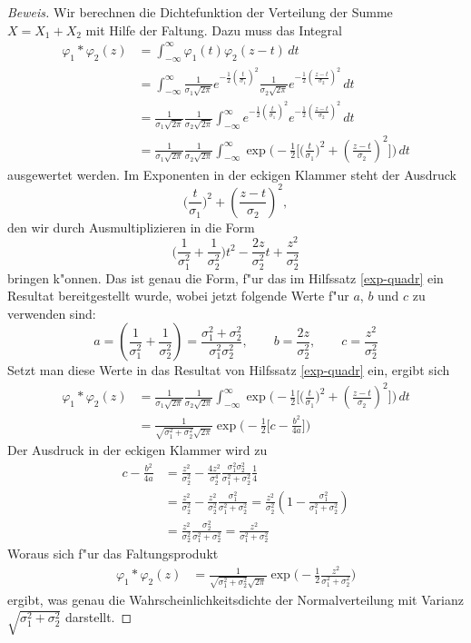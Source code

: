 \begin{proof}[Beweis]
Wir berechnen die Dichtefunktion der Verteilung der Summe $X=X_1+X_2$
mit Hilfe der Faltung. 
Dazu muss das Integral 
\begin{align*}
\varphi_1*\varphi_2(z)
&=
\int_{-\infty}^{\infty}\varphi_1(t)\varphi_2(z-t)\,dt\\
&=
\int_{-\infty}^{\infty}
\frac1{\sigma_1\sqrt{2\pi}}e^{-\frac12\left(\frac{t}{\sigma_1}\right)^2}
\frac1{\sigma_2\sqrt{2\pi}}e^{-\frac12\left(\frac{z-t}{\sigma_2}\right)^2}
\,dt\\
&=
\frac1{\sigma_1\sqrt{2\pi}}
\frac1{\sigma_2\sqrt{2\pi}}
\int_{-\infty}^{\infty}
e^{-\frac12\left(\frac{t}{\sigma_1}\right)^2}
e^{-\frac12\left(\frac{z-t}{\sigma_2}\right)^2}
\,dt\\
&=
\frac1{\sigma_1\sqrt{2\pi}}
\frac1{\sigma_2\sqrt{2\pi}}
\int_{-\infty}^{\infty}
\exp\biggl(-\frac12\biggl[\biggl(\frac{t}{\sigma_1}\biggr)^2
+\left(\frac{z-t}{\sigma_2}\right)^2\biggr]\biggr)
\,dt
\end{align*}
ausgewertet werden.
Im Exponenten in der eckigen Klammer steht der Ausdruck
\[
\biggl(\frac{t}{\sigma_1}\biggr)^2 +\left(\frac{z-t}{\sigma_2}\right)^2,
\]
den wir durch Ausmultiplizieren in die Form
\[
\biggl(\frac1{\sigma_1^2}+\frac1{\sigma_2^2}\biggr)t^2
-\frac{2z}{\sigma_2^2}t+\frac{z^2}{\sigma_2^2}
\]
bringen k"onnen.
Das ist genau die Form, f"ur das im Hilfssatz \ref{exp-quadr}
ein Resultat bereitgestellt wurde, wobei jetzt folgende Werte f"ur $a$, $b$ und $c$
zu verwenden sind:
\[
a=\left(\frac1{\sigma_1^2}+\frac1{\sigma_2^2}\right)
=\frac{\sigma_1^2+\sigma_2^2}{\sigma_1^2\sigma_2^2},\qquad
b=\frac{2z}{\sigma_2^2},\qquad
c=\frac{z^2}{\sigma_2^2}
\]
Setzt man diese Werte in das Resultat von Hilfssatz \ref{exp-quadr} ein,
ergibt sich
\begin{align*}
\varphi_1*\varphi_2(z)
&=
\frac1{\sigma_1\sqrt{2\pi}}
\frac1{\sigma_2\sqrt{2\pi}}
\int_{-\infty}^{\infty}
\exp\biggl(-\frac12\biggl[\biggl(\frac{t}{\sigma_1}\biggr)^2
+\left(\frac{z-t}{\sigma_2}\right)^2\biggr]\biggr)
\,dt\\
&=
\frac1{\sqrt{\sigma_1^2+\sigma_2^2}\sqrt{2\pi}}
\exp\biggl(-\frac12\biggl[c-\frac{b^2}{4a} \biggr]\biggr)
\end{align*}
Der Ausdruck in der eckigen Klammer wird zu
\begin{align*}
c-\frac{b^2}{4a}
&=
\frac{z^2}{\sigma_2^2}
-
\frac{4z^2}{\sigma_2^4}
\frac{\sigma_1^2\sigma_2^2}{\sigma_1^2+\sigma_2^2}
\frac14\\
&=
\frac{z^2}{\sigma_2^2}
-
\frac{z^2}{\sigma_2^2}
\frac{\sigma_1^2}{\sigma_1^2+\sigma_2^2}
=
\frac{z^2}{\sigma_2^2}
\left(
1-\frac{\sigma_1^2}{\sigma_1^2+\sigma_2^2}
\right)\\
&=
\frac{z^2}{\sigma_2^2}
\frac{\sigma_2^2}{\sigma_1^2+\sigma_2^2}
=
\frac{z^2}
{\sigma_1^2+\sigma_2^2}
\end{align*}
Woraus sich f"ur das Faltungsprodukt
\begin{align*}
\varphi_1*\varphi_2(z)
&=
\frac1{\sqrt{\sigma_1^2+\sigma_2^2}\sqrt{2\pi}}
\exp\biggl(-\frac12\frac{z^2}{\sigma_1^2+\sigma_2^2}\biggr)
\end{align*}
ergibt, was genau die Wahrscheinlichkeitsdichte der Normalverteilung
mit Varianz $\sqrt{\sigma_1^2+\sigma_2^2}$ darstellt.
\end{proof}

